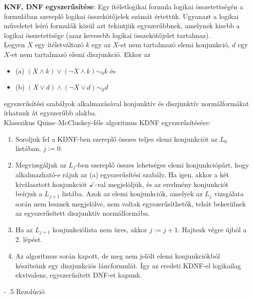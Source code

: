 \documentclass[tikz,12pt,margin=0px]{article}
\makeatletter
\renewcommand\paragraph{%
	\@startsection{paragraph}{4}{0mm}%
	{-\baselineskip}%
	{.5\baselineskip}%
	{\normalfont\normalsize\bfseries}}
\makeatother
\begin{document}
    \noindent \textbf{KNF, DNF egyszerűsítése}: Egy ítéletlogikai formula logikai összetettségén a formulában szereplő logikai összekötőjelek számát értettük. Ugyanazt a logikai műveletet leíró formulák közül azt tekintjük egyszerűbbnek, amelynek kisebb a logikai összetettsége (azaz kevesebb logikai összekötőjelet tartalmaz).\\
	
	\noindent Legyen $X$ egy ítéletváltozó $k$ egy az $X$-et nem tartalmazó elemi konjunkció, $d$ egy $X$-et nem tartalmazó elemi
	diszjunkció. Ekkor az
	
	\begin{itemize}
		\item	(a) $(X \wedge k) \vee (\neg X \wedge k) \sim_{0} k $ és
		
		\item	(b) $(X \vee d) \wedge (\neg X \vee d) \sim_{0} d $
	\end{itemize}
	egyszerűsítési szabályok alkalmazásával konjunktív és diszjunktív normálformákat írhatunk át egyszerűbb alakba.\\
	
	\noindent Klasszikus Quine--McCluskey-féle algoritmus KDNF egyszerűsítésére:
	
	\begin{enumerate}
		\item	Soroljuk fel a KDNF-ben szereplő összes teljes elemi konjunkciót az $L_{0}$ listában, $j:=0$.
		
		\item	Megvizsgáljuk az $L_{j}$-ben szereplő összes lehetséges elemi konjunkciópárt, hogy alkalmazható-e
		rájuk az (a) egyszerűsítési szabály. Ha igen, akkor a két kiválasztott konjunkciót $\checkmark$-val megjelöljük,
		és az eredmény konjunkciót beírjuk a $L_{j+1}$ listába. Azok az elemi konjunkciók, amelyek az $L_{j}$ vizsgálata
		során nem lesznek megjelölve, nem voltak egyszerűsíthetők, tehát bekerülnek az egyszerűsített diszjunktív
		normálformába.
		
		\item	Ha az $L_{j+1}$ konjunkciólista nem üres, akkor $j:=j+1$. Hajtsuk végre újból a 2. lépést.
		
		\item	Az algoritmus során kapott, de meg nem jelölt elemi konjunkciókból készítsünk egy diszjunkciós
		láncformulát. Így az eredeti KDNF-el logikailag ekvivalens, egyszerűsített DNF-et kapunk.
	\end{enumerate}
	
	\paragraph{Rezolúció}
	
\end{document}
